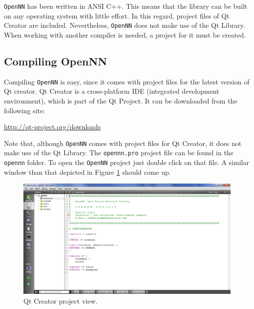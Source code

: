 \texttt{OpenNN} has been written in ANSI C++. 
This means that the library can be built on any operating system with little effort. 
In this regard, project files of Qt Creator are included.
Nevertheless, \texttt{OpenNN} does not make use of the Qt Library. 
When working with another compiler is needed, a project for it must be created.

\subsection*{Compiling OpenNN}

Compiling \texttt{OpenNN} is easy, since it comes with project files for the latest version of Qt creator.
Qt Creator is a cross-platform IDE (integrated development environment), which is part of the Qt Project.
It can be downloaded from the following site:

\begin{flushleft}
\href{http://qt-project.org/downloads}{http://qt-project.org/downloads}
\end{flushleft}

Note that, although \texttt{OpenNN} comes with project files for Qt Creator, it does not make use of the Qt Library.
The \lstinline"opennn.pro" project file can be found in the \lstinline"opennn" folder.
To open the \texttt{OpenNN} project just double click on that file. 
A similar window than that depicted in Figure \ref{QtCreatorProject} should come up.

\begin{figure}[h!]
\begin{center}
\includegraphics[width=1.0\textwidth]{preliminaries/qt_creator_project}
\caption{Qt Creator project view.}\label{QtCreatorProject}
\end{center}
\end{figure}


